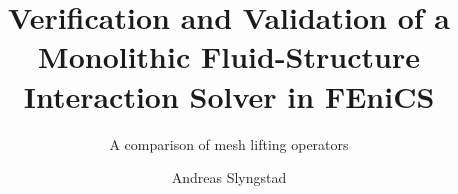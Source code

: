 \documentclass[a4paper, twoside,openright ,titlepage, 12pt]{book}
\title{Verification and Validation of a Monolithic Fluid-Structure Interaction Solver in FEniCS}
\subtitle{A comparison of mesh lifting operators}
\author{Andreas Slyngstad}
\begin{document}
                                                                                                                          
\masterfrontpage

\tableofcontents
\newtheorem{theorem}{Theorem}[section]
\newtheorem{lemma}[theorem]{Lemma}

%
%
%
%
%
%
%




\end{document}
